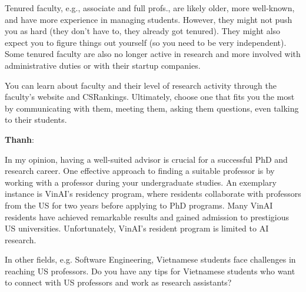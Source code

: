 \documentclass[11pt]{article}
\newenvironment{commentbox}[1][]{
\small
    \begin{cbox}
    \textbf{#1}: 
 }{
   \end{cbox}
}
\begin{document}
Tenured faculty, e.g., associate and full profs., are likely older, more well-known, and have more experience in managing students.  However, they might not push you as hard (they don't have to, they already got tenured). They might also expect you to figure things out yourself (so you need to be very independent).  Some tenured faculty are also no longer active in research and more involved with administrative duties or with their startup companies. 

You can learn about faculty and their level of research activity through the faculty's website and CSRankings.
Ultimately, choose one that fits you the most by communicating with them, meeting them, asking them questions, even talking to their students. 

\begin{commentbox}[Thanh]
    In my opinion, having a well-suited advisor is crucial for a successful PhD and research career. One effective approach to finding a suitable professor is by working with a professor during your undergraduate studies. An exemplary instance is VinAI's residency program, where residents collaborate with professors from the US for two years before applying to PhD programs. Many VinAI residents have achieved remarkable results and gained admission to prestigious US universities. Unfortunately, VinAI's resident program is limited to AI research. 
    
    In other fields, e.g. Software Engineering, Vietnamese students face challenges in reaching US professors. Do you have any tips for Vietnamese students who want to connect with US professors and work as research assistants?
    \end{commentbox}

\end{document}

